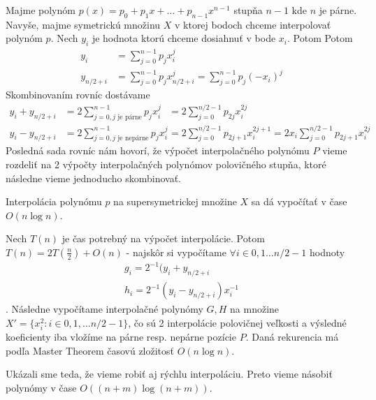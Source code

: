 Majme polynóm $p(x)=p_0 + p_1 x + \dots + p_{n-1} x^{n-1}$ stupňa
$n-1$ kde $n$ je párne. Navyše, majme symetrickú množinu $X$ v ktorej
bodoch chceme interpolovať polynóm $p$. 
Nech $y_i$ je hodnota ktorú chceme dosiahnuť v bode $x_i$. Potom
Potom
\begin{eqnarray}
    y_i &= \sum_{j=0}^{n-1} p_j x_i^j \\
    y_{n/2+i} &= \sum_{j=0}^{n-1} p_j x_{n/2+i}^j 
            = \sum_{j=0}^{n-1} p_j (-x_i)^j 
\end{eqnarray}
Skombinovaním rovníc dostávame
\begin{eqnarray}
    y_i + y_{n/2 + i} &= 2 \sum_{j=0, j\text{ je párne}}^{n-1} p_j x_i^j
     &= 2 \sum_{j=0}^{n/2-1} p_{2j} x_i^{2j} \\
    y_i - y_{n/2 + i} &= 2 \sum_{j=0, j\text{ je nepárne}}^{n-1} p_j x_i^j
     &= 2 \sum_{j=0}^{n/2-1} p_{2j+1} x_i^{2j+1} =
      2 x_i \sum_{j=0}^{n/2-1} p_{2j+1} x_i^{2j}
\end{eqnarray}
Posledná sada rovníc nám hovorí, že výpočet interpolačného polynómu
$P$ vieme rozdeliť na 2 výpočty interpolačných polynómov polovičného
stupňa, ktoré následne vieme jednoducho skombinovať.
\begin{lema}
    Interpolácia polynómu $p$ na supersymetrickej množine $X$ sa dá
    vypočítať v čase $O(n \log n)$.
\end{lema}
\begin{dokaz}
    Nech $T(n)$ je čas potrebný na výpočet interpolácie.
    Potom $T(n)=2 T(\frac{n}{2}) + O(n)$ - najskôr si vypočítame
    $\forall i \in 0,1\dots n/2-1$ hodnoty 
    \begin{eqnarray}
        \label{eq:interpolacia_g}
        g_i = 2^{-1}(y_i + y_{n/2+i} \\
        \label{eq:interpolacia_h}
        h_i = 2^{-1}(y_i - y_{n/2+i}) x_i^{-1}
    \end{eqnarray}. Následne
    vypočítame interpolačné polynómy $G,H$ na množine
    $X'=\{x_i^2 : i \in 0,1,\dots n/2-1\}$, čo sú 2 interpolácie
    polovičnej veľkosti a výsledné koeficienty iba vložíme na párne
    resp. nepárne pozície $P$.
    Daná rekurencia má podľa Master Theorem časovú zložitosť $O(n \log
    n)$.
\end{dokaz}

Ukázali sme teda, že vieme robiť aj rýchlu interpoláciu. Preto vieme
násobiť polynómy v čase $O((n+m) \log (n+m))$.


